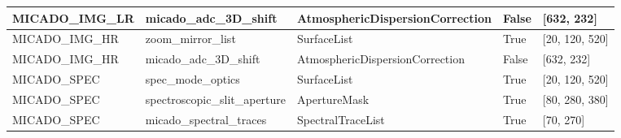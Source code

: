 \begin{longtable*}[c]{|p{0.181\DUtablewidth}|p{0.270\DUtablewidth}|p{0.262\DUtablewidth}|p{0.077\DUtablewidth}|p{0.165\DUtablewidth}|}
MICADO\_IMG\_LR
 & 
micado\_adc\_3D\_shift
 & 
AtmosphericDispersionCorrection
 & 
False
 & 
{[}632, 232{]}
 \\
\hline

MICADO\_IMG\_HR
 & 
zoom\_mirror\_list
 & 
SurfaceList
 & 
True
 & 
{[}20, 120, 520{]}
 \\
\hline

MICADO\_IMG\_HR
 & 
micado\_adc\_3D\_shift
 & 
AtmosphericDispersionCorrection
 & 
False
 & 
{[}632, 232{]}
 \\
\hline

MICADO\_SPEC
 & 
spec\_mode\_optics
 & 
SurfaceList
 & 
True
 & 
{[}20, 120, 520{]}
 \\
\hline

MICADO\_SPEC
 & 
spectroscopic\_slit\_aperture
 & 
ApertureMask
 & 
True
 & 
{[}80, 280, 380{]}
 \\
\hline

MICADO\_SPEC
 & 
micado\_spectral\_traces
 & 
SpectralTraceList
 & 
True
 & 
{[}70, 270{]}
 \\
\hline
\end{longtable*}
\label{tbl-effects-summary}
